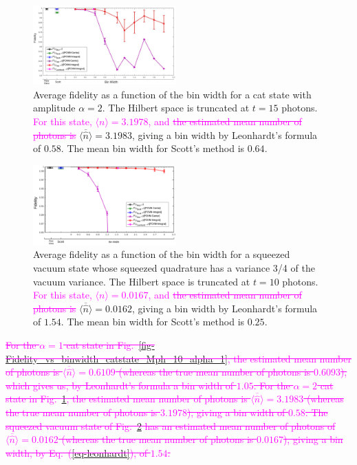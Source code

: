 \documentclass[
reprint,
superscriptaddress,
showpacs,
amsmath,
amssymb,
aps,
pra,
longbibliography
]{revtex4-1}
\providecommand{\aucmnt}[1]{#1}
\providecommand{\editcolor}[2]{\textcolor{#1}{#2}}
\providecommand{\aucmnt}[1]{}
\providecommand{\editcolor}[2]{#2}
\newcommand{\SG}[1]{\editcolor{magenta}{#1}}
\newcommand{\SGs}[1]{\aucmnt{\editcolor{magenta}{\sout{#1}}}}
\begin{document}
\begin{figure}
  \includegraphics[width=0.49\textwidth]{catstate-alpha=2-15photons.eps}
  \caption{Average fidelity as a function of the bin width for a cat
    state with amplitude $\alpha = 2$. The Hilbert space is truncated
    at $t=15$ photons. \SG{For this state,
      $\langle n \rangle = 3.1978$, and} \SGs{the estimated mean
      number of photons is}
    $\overline{\langle \hat{n} \rangle}=3.1983$, giving a bin width by
    Leonhardt's formula of $0.58$.  The mean bin width for Scott's
    method is $0.64$.}
  \label{fig-Fid_vs_binwidth_catstate_alpha_2_Mph_15}
\end{figure}

\begin{figure}
  \includegraphics[width=0.49\textwidth]{squeezedvacuum-10photons-Var=075.eps}
  \caption{Average fidelity as a function of the bin width for a
    squeezed vacuum state whose squeezed quadrature has a variance 3/4
    of the vacuum variance. The Hilbert space is truncated at $t=10$
    photons.  \SG{For this state, $\langle n \rangle = 0.0167$, and}
    \SGs{the estimated mean number of photons is}
    $\overline{\langle \hat{n} \rangle}=0.0162$, giving a bin width by
    Leonhardt's formula of $1.54$.  The mean bin width for Scott's
    method is $0.25$.}
  \label{fig-squeezed_vacuum_variance_075_Mph_10}
\end{figure}

\SGs{For the $\alpha = 1$ cat state in
  Fig.~\ref{fig-Fidelity_vs_binwidth_catstate_Mph_10_alpha_1}, the
  estimated mean number of photons is
  $\overline{\langle \hat{n} \rangle}=0.6109$ (whereas the true mean
  number of photons is $0.6093$), which gives us, by Leonhardt's
  formula a bin width of $1.05$. For the $\alpha = 2$ cat state in
  Fig.~\ref{fig-Fid_vs_binwidth_catstate_alpha_2_Mph_15}, the
  estimated mean number of photons is
  $\overline{\langle \hat{n} \rangle}=3.1983$ (whereas the true mean
  number of photons is $3.1978$), giving a bin width of $0.58$. The
  squeezed vacuum state of
  Fig.~\ref{fig-squeezed_vacuum_variance_075_Mph_10} has an estimated
  mean number of photons of
  $\overline{\langle \hat{n} \rangle}=0.0162$ (whereas the true mean
  number of photons is $0.0167$), giving a bin width, by
  Eq.~(\ref{eq-leonhardt}), of $1.54$.}
\end{document}
